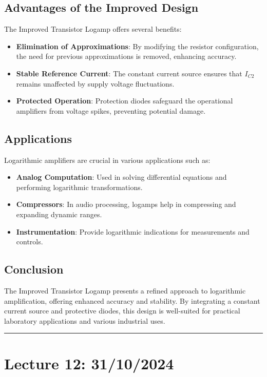 \documentclass[a4paper,9pt,twoside,openany,twocolumn]{memoir}
\begin{document}
\subsection{Advantages of the Improved Design}
The Improved Transistor Logamp offers several benefits:
\begin{itemize}
    \item \textbf{Elimination of Approximations}: By modifying the resistor configuration, the need for previous approximations is removed, enhancing accuracy.
    \item \textbf{Stable Reference Current}: The constant current source ensures that \( I_{C2} \) remains unaffected by supply voltage fluctuations.
    \item \textbf{Protected Operation}: Protection diodes safeguard the operational amplifiers from voltage spikes, preventing potential damage.
\end{itemize}

\subsection{Applications}
Logarithmic amplifiers are crucial in various applications such as:
\begin{itemize}
    \item \textbf{Analog Computation}: Used in solving differential equations and performing logarithmic transformations.
    \item \textbf{Compressors}: In audio processing, logamps help in compressing and expanding dynamic ranges.
    \item \textbf{Instrumentation}: Provide logarithmic indications for measurements and controls.
\end{itemize}

\subsection{Conclusion}
The Improved Transistor Logamp presents a refined approach to logarithmic amplification, offering enhanced accuracy and stability. By integrating a constant current source and protective diodes, this design is well-suited for practical laboratory applications and various industrial uses.
\begin{center}\rule{0.5\linewidth}{0.5pt}\end{center}

\section*{Lecture 12: 31/10/2024}
\end{document}
